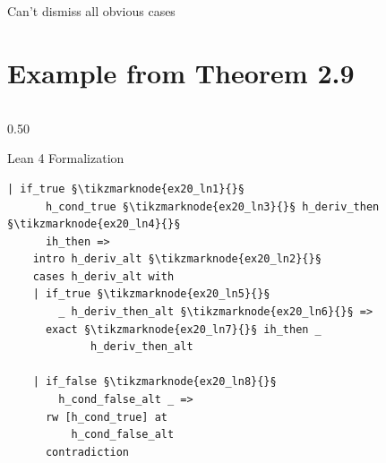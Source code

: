 \documentclass[xcolor={dvipsnames,table}]{beamer}
\begin{document}
\begin{frame}[fragile]{Can't dismiss all obvious cases}
\section*{Example from Theorem 2.9}
    \begin{columns}[T]
        
        \begin{column}{0.50\textwidth}
            \begin{block}{Lean 4 Formalization}
                \begin{lstlisting}[style=lean4, basicstyle=\scriptsize\ttfamily]
  | if_true §\tikzmarknode{ex20_ln1}{}§
      h_cond_true §\tikzmarknode{ex20_ln3}{}§ h_deriv_then §\tikzmarknode{ex20_ln4}{}§
      ih_then =>
    intro h_deriv_alt §\tikzmarknode{ex20_ln2}{}§
    cases h_deriv_alt with
    | if_true §\tikzmarknode{ex20_ln5}{}§
        _ h_deriv_then_alt §\tikzmarknode{ex20_ln6}{}§ =>
      exact §\tikzmarknode{ex20_ln7}{}§ ih_then _
             h_deriv_then_alt

    | if_false §\tikzmarknode{ex20_ln8}{}§
        h_cond_false_alt _ =>
      rw [h_cond_true] at
          h_cond_false_alt
      contradiction
                \end{lstlisting}
            \end{block}
        \end{column}


\end{columns}
\end{frame}
\end{document}
